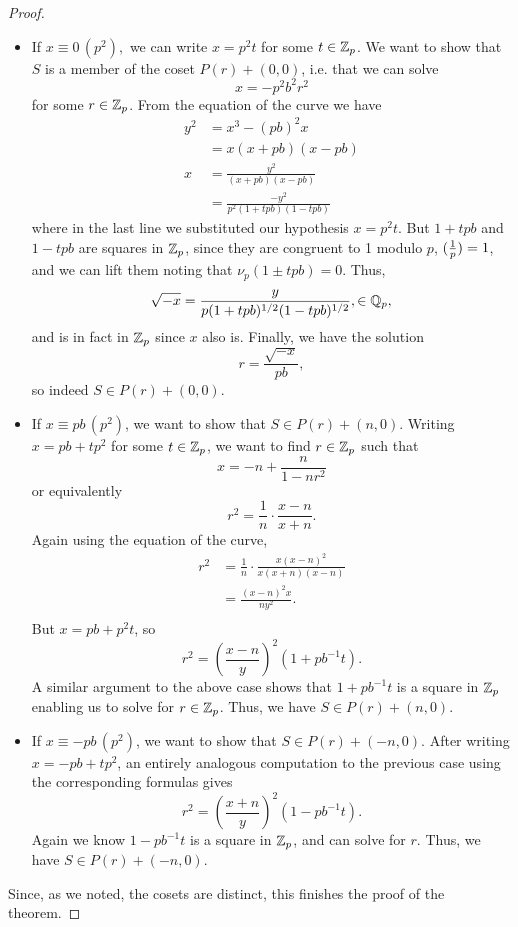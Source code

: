 \documentclass[12pt, a4paper]{amsart}
\begin{document}
\begin{proof}
  \begin{itemize}
    \item If $x \equiv 0 \, (p^2),$ we can write $x = p^2t$ for some $t \in
      {\mathbb Z}_p$. We want to show that $S$ is a member of the coset $P(r) + (0,0)$,
      i.e. that we can solve
      \[x = -p^2b^2r^2\]
      for some $r \in {\mathbb Z}_p$.
      From the equation of the curve we have
      \begin{equation*}
        \begin{split}
          y^2 &= x^3 - (pb)^2x \\
          &= x(x+pb)(x-pb) \\
          x &= \frac{y^2}{(x+pb)(x-pb)} \\
          &= \frac{-y^2}{p^2(1+tpb)(1-tpb)}
        \end{split}
      \end{equation*}
      where in the last line we substituted our hypothesis $x = p^2t.$ But
      $1 + tpb$ and $1-tpb$ are squares in ${\mathbb Z}_p$, since they are congruent to
      1 modulo $p$, $(\frac{1}{p}) = 1$, and we can lift them noting that
      $\nu_p(1 \pm tpb) = 0$. Thus, 
      \[\sqrt{-x} = \frac{y}{p (1+tpb)^{1/2} (1-tpb)^{1/2}}, \in {\mathbb Q}_p,\]
      and is in fact in ${\mathbb Z}_p$ since $x$ also is. Finally, we have the solution
      \[r = \frac{\sqrt{-x}}{pb},\]
      so indeed $S \in P(r) + (0,0).$


    \item If $x \equiv pb \, (p^2)$, we want to show that $S \in P(r) + (n,0)$.
      Writing $x = pb + tp^2$ for some $t \in {\mathbb Z}_p$, we want to find $r \in
      {\mathbb Z}_p$ such that
      \[x = -n + \frac{n}{1-nr^2} \]
      or equivalently
      \[r^2 = \frac{1}{n} \cdot \frac{x-n}{x+n}. \]
      Again using the equation of the curve,
      \[ \begin{split} r^2 &= \frac{1}{n} \cdot \frac{x (x-n)^2}{x
            (x+n)(x-n)} \\
          &= \frac{(x-n)^2x}{n y^2}. \\
        \end{split}\]
      But $x = pb + p^2t$, so
      \[ r^2 = \left(\frac{x-n}{y}\right)^2 (1+pb^{-1}t).\]
      A similar argument to the above case shows that $1+pb^{-1}t$ is
      a square in ${\mathbb Z}_p$ enabling us to solve for $r \in {\mathbb Z}_p$.
      Thus, we have $S \in P(r) + (n,0)$.

    \item If $x \equiv -pb \, (p^2)$, we want to show that $S \in P(r) +
      (-n,0)$. After writing $x = -pb + tp^2$, an entirely analogous computation
      to the previous case using the corresponding formulas gives
      \[r^2 = \left( \frac{x+n}{y} \right)^2 (1 - pb^{-1}t).\]
      Again we know $1-pb^{-1}t$ is a square in ${\mathbb Z}_p$, and can solve for
      $r$. Thus, we have $S \in P(r) + (-n,0)$.
  \end{itemize}

  Since, as we noted, the cosets are distinct, this finishes the proof of the theorem.
\end{proof}
\end{document}
